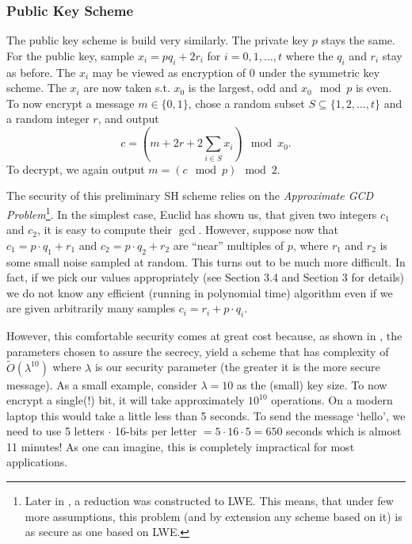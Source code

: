 \subsubsection*{Public Key Scheme}
The public key scheme is build very similarly. The private key $p$ stays the same. For the public key, sample $x_i = p q_i + 2r_i$ for $i = 0, 1, \dots, t$ where the $q_i$ and $r_i$ stay as before. The $x_i$ may be viewed as encryption of 0 under the symmetric key scheme. The $x_i$ are now taken s.t. $x_0$ is the largest, odd and $x_0 \mod p$ is even.\\
To now encrypt a message $m \in \{0,1\}$, chose a random subset $S \subseteq \{1, 2, \dots, t\}$ and a random integer $r$, and output
\begin{equation} c = (m + 2r + 2\sum_{i \in S} x_i) \mod x_0.\end{equation}
To decrypt, we again output $m = (c \mod p) \mod 2$.

The security of this preliminary SH scheme relies on the \textit{Approximate GCD Problem}\footnote{Later in \cite{revisited}, a reduction was constructed to LWE. This means, that under few more assumptions, this problem (and by extension any scheme based on it) is as secure as one based on LWE.}. In the simplest case, Euclid has shown us, that given two integers $c_1$ and $c_2$, it is easy to compute their $\gcd$. However, suppose now that $c_1 = p \cdot q_1 + r_1$ and $c_2 = p \cdot q_2 + r_2$ are ``near'' multiples of $p$, where $r_1$ and $r_2$ is some small noise sampled at random. This turns out to be much more difficult. In fact, if we pick our values appropriately (see \cite{easy_fhe} Section 3.4 and \cite{int_scheme} Section 3 for details) we do not know any efficient (running in polynomial time) algorithm even if we are given arbitrarily many samples $c_i = r_i + p \cdot q_i$.

However, this comfortable security comes at great cost because, as shown in \cite{int_scheme}, the parameters chosen to assure the secrecy, yield a scheme that has complexity of $\tilde{O}(\lambda^{10})$ where $\lambda$ is our security parameter (the greater it is the more secure message). As a small example, consider $\lambda = 10$ as the (small) key size. To now encrypt a single(!) bit, it will take approximately $10^{10}$ operations. On a modern laptop this would take a little less than 5 seconds. To send the message `hello', we need to use 5 letters $\cdot$ 16-bits per letter $= 5\cdot 16\cdot5 = 650$ seconds which is almost 11 minutes! As one can imagine, this is completely impractical for most applications.

